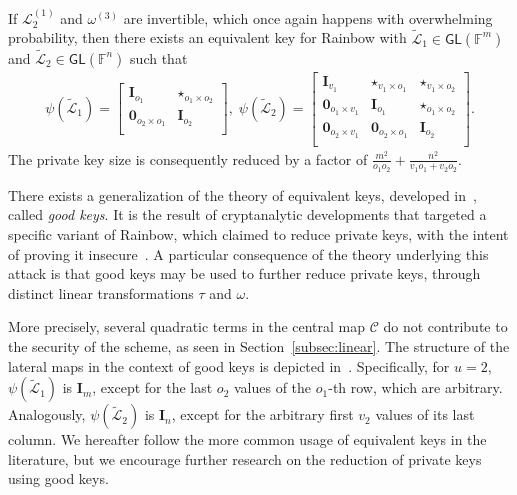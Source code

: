 \documentclass[12pt, a4paper, oneside]{memoir}
\theoremstyle{definition}
\begin{document}
If $\mathcal{L}_{2}^{(1)}$ and $\omega^{(3)}$ are invertible, which once again happens with overwhelming probability, then there exists an equivalent key for Rainbow with $\widetilde{\mathcal{L}}_{1} \in \mathsf{GL}(\mathbb{F}^{m})$ and $\widetilde{\mathcal{L}}_{2} \in \mathsf{GL}(\mathbb{F}^{n})$ such that
\begin{align}
  \psi(\widetilde{\mathcal{L}}_{1}) =
  \begin{bmatrix}
    \mathbf{I}_{o_{1}} & \star_{o_{1} \times o_{2}} \\
    \mathbf{0}_{o_{2} \times o_{1}} & \mathbf{I}_{o_{2}} \\
  \end{bmatrix},\;
  \psi(\widetilde{\mathcal{L}}_{2}) =
  \begin{bmatrix}
    \mathbf{I}_{v_{1}} & \star_{v_{1} \times o_{1}} & \star_{v_{1} \times o_{2}} \\
    \mathbf{0}_{o_{1} \times v_{1}} & \mathbf{I}_{o_{1}} & \star_{o_{1} \times o_{2}} \\
    \mathbf{0}_{o_{2} \times v_{1}} & \mathbf{0}_{o_{2} \times o_{1}} & \mathbf{I}_{o_{2}} \\
  \end{bmatrix}.
\end{align}
The private key size is consequently reduced by a factor of $\frac{m^{2}}{o_{1} o_{2}} + \frac{n^{2}}{v_{1} o_{1} + v_{2} o_{2}}$.

There exists a generalization of the theory of equivalent keys, developed in~\cite{Thomae:201306}, called \emph{good keys}. It is the result of cryptanalytic developments that targeted a specific variant of Rainbow, which claimed to reduce private keys, with the intent of proving it insecure~\cite{Thomae:201207}. A particular consequence of the theory underlying this attack is that good keys may be used to further reduce private keys, through distinct linear transformations $\tau$ and $\omega$.

More precisely, several quadratic terms in the central map $\mathcal{C}$ do not contribute to the security of the scheme, as seen in Section~\ref{subsec:linear}. The structure of the lateral maps in the context of good keys is depicted in~\cite[Fig.~3]{Shim:202001}. Specifically, for $u = 2$, $\psi(\widetilde{\mathcal{L}}_{1})$ is $\mathbf{I}_{m}$, except for the last $o_{2}$ values of the $o_{1}$-th row, which are arbitrary. Analogously, $\psi(\widetilde{\mathcal{L}}_{2})$ is $\mathbf{I}_{n}$, except for the arbitrary first $v_{2}$ values of its last column. We hereafter follow the more common usage of equivalent keys in the literature, but we encourage further research on the reduction of private keys using good keys.
\end{document}
